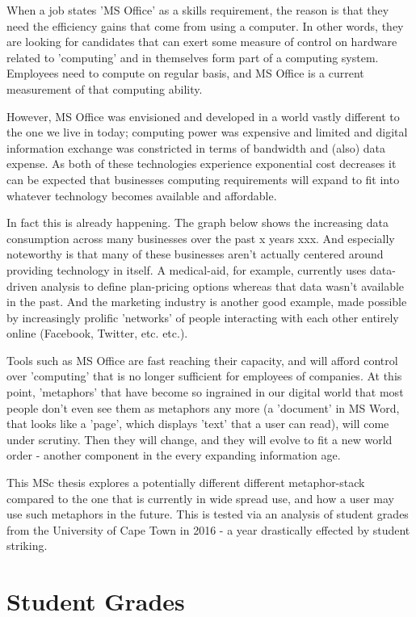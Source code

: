 When a job states 'MS Office' as a skills requirement, the reason is that they need the efficiency gains that come from using a computer. In other words, they are looking for candidates that can exert some measure of control on hardware related to 'computing' and in themselves form part of a computing system. Employees need to compute on regular basis, and MS Office is a current measurement of that computing ability.

However, MS Office was envisioned and developed in a world vastly different to the one we live in today; computing power was expensive and limited and digital information exchange was constricted in terms of bandwidth and (also) data expense. As both of these technologies experience exponential cost decreases it can be expected that businesses computing requirements will expand to fit into whatever technology becomes available and affordable.

In fact this is already happening. The graph below shows the increasing data consumption across many businesses over the past x years xxx. And especially noteworthy is that many of these businesses aren't actually centered around providing technology in itself. A medical-aid, for example, currently uses data-driven analysis to define plan-pricing options whereas that data wasn't available in the past. And the marketing industry is another good example, made possible by increasingly prolific 'networks' of people interacting with each other entirely online (Facebook, Twitter, etc. etc.).

Tools such as MS Office are fast reaching their capacity, and will afford control over 'computing' that is no longer sufficient for employees of companies. At this point, 'metaphors' that have become so ingrained in our digital world that most people don't even see them as metaphors any more (a 'document' in MS Word, that looks like a 'page', which displays 'text' that a user can read), will come under scrutiny. Then they will change, and they will evolve to fit a new world order - another component in the every expanding information age.

This MSc thesis explores a potentially different different metaphor-stack compared to the one that is currently in wide spread use, and how a user may use such metaphors in the future. This is tested via an analysis of student grades from the University of Cape Town in 2016 - a year drastically effected by student striking.

\section{Student Grades}

